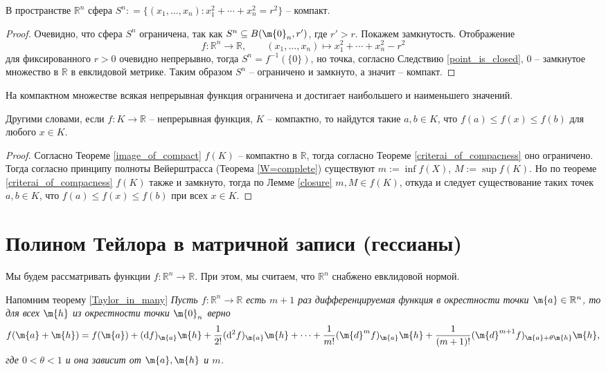 \begin{corollary}\label{sphere_is_compact}
    В пространстве $\mathbb{R}^n$ сфера $S^n: =\{(x_1,\ldots, x_n): x_1^2 + \cdots +x_n^2 =r^2\}$ -- компакт.
\end{corollary}
\begin{proof}
 Очевидно, что сфера $S^n$ ограничена, так как $S^n \subseteq B(\m{0}_n, r')$, где $r'>r$. Покажем замкнутость. Отображение
 \[
  f: \mathbb{R}^n \to \mathbb{R}, \qquad (x_1,\ldots, x_n) \mapsto x_1^2 + \cdots + x_n^2 - r^2
 \]
 для фиксированного $r>0$ очевидно непрерывно, тогда $S^n= f^{-1}(\{0\})$, но точка, согласно Следствию \ref{point_is_closed}, $0$ -- замкнутое множество в $\mathbb{R}$ в евклидовой метрике. Таким образом $S^n$ -- ограничено и замкнуто, а значит -- компакт.
\end{proof}



\begin{theorem}\label{general_Weistrass}
    На компактном множестве всякая непрерывная функция ограничена и достигает наибольшего и наименьшего значений.
\end{theorem}
Другими словами, если $f:K \to \mathbb{R}$ -- непрерывная функция, $K$ -- компактно, то найдутся такие $a,b \in K$, что $f(a) \le f(x) \le f(b)$ для любого $x \in K$.

\begin{proof}
    Согласно Теореме \ref{image_of_compact} $f(K)$ -- компактно в $\mathbb{R}$, тогда согласно Теореме \ref{criterai_of_compacness} оно ограничено. Тогда согласно принципу полноты Вейерштрасса (Теорема \ref{W=complete}) существуют $m:=\inf f(X)$, $M:= \sup f(K).$ Но по теореме \ref{criterai_of_compacness} $f(K)$ также и замкнуто, тогда по Лемме \ref{closure} $m,M \in f(K)$, откуда и следует существование таких точек $a,b\in K$, что $f(a) \le f(x) \le f(b)$ при всех $x\in K.$
\end{proof}



\section{Полином Тейлора в матричной записи (гессианы)}


Мы будем рассматривать функции $f:\mathbb{R}^n \to \mathbb{R}$. При этом, мы считаем, что $\mathbb{R}^n$ снабжено евклидовой нормой.

Напомним теорему \ref{Taylor_in_many}
\textit{Пусть $f:\mathbb{R}^n \to \mathbb{R}$ есть $m+1$ раз дифференцируемая функция в окрестности точки $\m{a} \in \mathbb{R}^n$, то для всех $\m{h}$ из окрестности точки $\m{0}_n$ верно 
    \[
     f(\m{a} + \m{h}) = f(\m{a}) + (\mathrm{d}f)_\m{a} \m{h} + \frac{1}{2!} (\mathrm{d}^2f)_\m{a}\m{h} + \cdots + \frac{1}{m!} (\m{d}^mf)_\m{a}\m{h} + \frac{1}{(m+1)!} (\m{d}^{m+1}f)_{\m{a}+ \theta \m{h}}\m{h},
    \]
    где $0 < \theta < 1$ и она зависит от $\m{a}, \m{h}$ и $m$.
}

